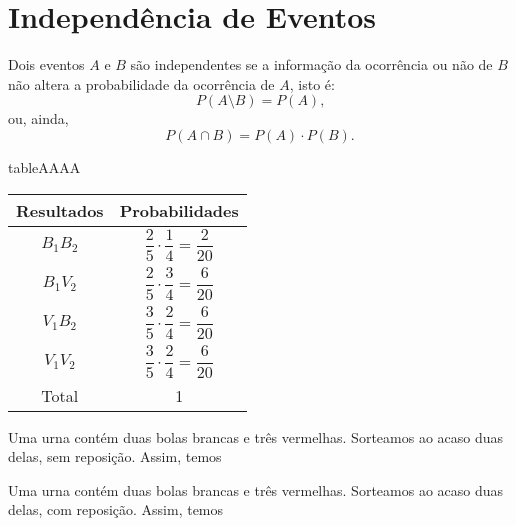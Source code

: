 \documentclass[11pt,fleqn]{book}
\numberwithin{mpicture}{chapter}
\numberwithin{mtable}{chapter}
\numberwithin{mframe}{chapter}
\begin{document}
\section{Independência de Eventos}

Dois eventos $A$ e $B$ são independentes se a informação da ocorrência ou não de $B$ não altera a probabilidade da ocorrência de $A$, isto é:
\[
	P(A\setminus B)=P(A)\text{,}
\]
ou, ainda,
\[
	P(A\cap B)=P(A)\cdot P(B)\text{.}
\]

\begin{sidepicture}{0cm}{table}{AAAA}
	\begin{tabular}{cc}\\\toprule
		Resultados & Probabilidades\\  \midrule
		$B_1 B_2$ & \vspace{5pt}$\dfrac{2}{5}\cdot\dfrac{1}{4}=\dfrac{2}{20}$ \\ 
		$B_1 V_2$ & \vspace{5pt}$\dfrac{2}{5}\cdot\dfrac{3}{4}=\dfrac{6}{20}$\\
		$V_1 B_2$ & \vspace{5pt}$\dfrac{3}{5}\cdot\dfrac{2}{4}=\dfrac{6}{20}$\\
		$V_1 V_2$ & \vspace{5pt}$\dfrac{3}{5}\cdot\dfrac{2}{4}=\dfrac{6}{20}$\\ \midrule
		Total & 1 \\ \bottomrule
	\end{tabular}
\end{sidepicture}

\begin{example}
	Uma urna contém duas bolas brancas e três vermelhas. Sorteamos ao acaso duas delas, sem reposição. Assim, temos
	

\end{example}

\begin{example}
	Uma urna contém duas bolas brancas e três vermelhas. Sorteamos ao acaso duas delas, com reposição. Assim, temos
	
	
\end{example}


\end{document}
